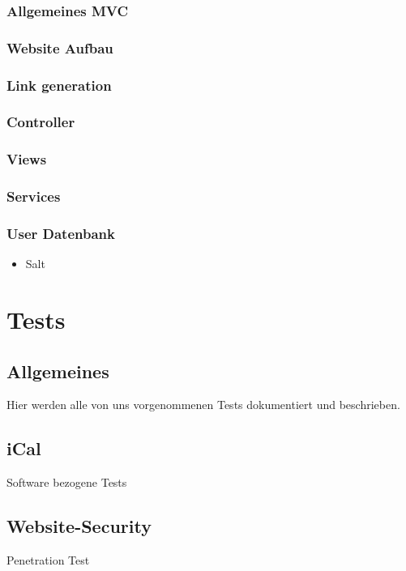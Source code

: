 \documentclass[12pt]{scrartcl}
\begin{document}
\subsubsection{Allgemeines MVC}
\label{sec:allgemein}

\subsubsection{Website Aufbau}
\label{sec:aufbau}
\subsubsection{Link generation}
\label{sec:link}
\subsubsection{Controller}
\label{sec:Controller}
\subsubsection{Views}
\label{sec:Views}
\subsubsection{Services}
\label{sec:Services}
\subsubsection{User Datenbank}
\label{sec:UserDB}
\begin{itemize}
	\item Salt
\end{itemize}
\label{sec:salt}

\section{Tests}
\label{sec:Tests}
\subsection{Allgemeines}
Hier werden alle von uns vorgenommenen Tests dokumentiert und beschrieben.

\subsection{iCal}
Software bezogene Tests

\subsection{Website-Security}
Penetration Test
\end{document}

